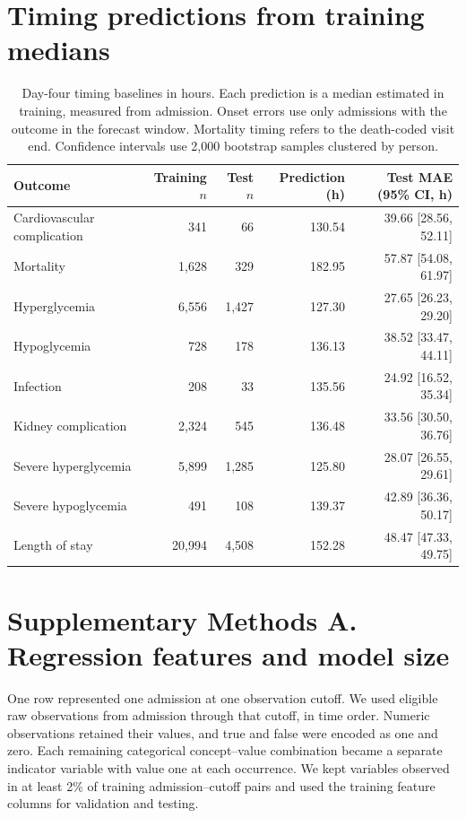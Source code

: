 ﻿\documentclass[11pt,a4paper]{article}
\begin{document}
\section{Timing predictions from training medians}
\begin{table}[htbp]\centering\small
\caption{Day-four timing baselines in hours. Each prediction is a median estimated in training, measured from admission. Onset errors use only admissions with the outcome in the forecast window. Mortality timing refers to the death-coded visit end. Confidence intervals use 2,000 bootstrap samples clustered by person.}
\label{tab:s-medians}
\begin{tabular}{lrrrr}
\toprule
Outcome & Training $n$ & Test $n$ & Prediction (h) & Test MAE (95\% CI, h) \\
\midrule
Cardiovascular complication & 341 & 66 & 130.54 & 39.66 [28.56, 52.11] \\
Mortality & 1,628 & 329 & 182.95 & 57.87 [54.08, 61.97] \\
Hyperglycemia & 6,556 & 1,427 & 127.30 & 27.65 [26.23, 29.20] \\
Hypoglycemia & 728 & 178 & 136.13 & 38.52 [33.47, 44.11] \\
Infection & 208 & 33 & 135.56 & 24.92 [16.52, 35.34] \\
Kidney complication & 2,324 & 545 & 136.48 & 33.56 [30.50, 36.76] \\
Severe hyperglycemia & 5,899 & 1,285 & 125.80 & 28.07 [26.55, 29.61] \\
Severe hypoglycemia & 491 & 108 & 139.37 & 42.89 [36.36, 50.17] \\
\midrule
Length of stay & 20,994 & 4,508 & 152.28 & 48.47 [47.33, 49.75] \\
\bottomrule
\end{tabular}
\end{table}
\clearpage
\section*{Supplementary Methods A. Regression features and model size}
One row represented one admission at one observation cutoff. We used eligible raw observations from admission through that cutoff, in time order. Numeric observations retained their values, and true and false were encoded as one and zero. Each remaining categorical concept--value combination became a separate indicator variable with value one at each occurrence. We kept variables observed in at least 2\% of training admission--cutoff pairs and used the training feature columns for validation and testing.
\end{document}
